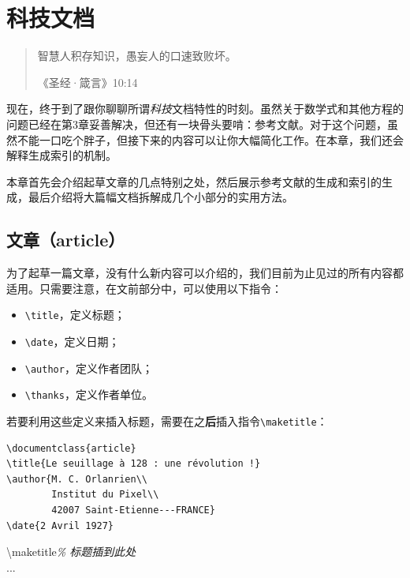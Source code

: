 \chapter{科技文档}

\begin{quote}
    智慧人积存知识，愚妄人的口速致败坏。
    
    \hfill《圣经·箴言》10:14
\end{quote}

现在，终于到了跟你聊聊所谓\emph{科技}文档特性的时刻。虽然关于数学式和其他方程的问题已经在第3章妥善解决，但还有一块骨头要啃：参考文献。对于这个问题，虽然不能一口吃个胖子，但接下来的内容可以让你大幅简化工作。在本章，我们还会解释生成索引的机制。

本章首先会介绍起草文章的几点特别之处，然后展示参考文献的生成和索引的生成，最后介绍将大篇幅文档拆解成几个小部分的实用方法。

\section{文章（article）}

为了起草一篇文章，没有什么新内容可以介绍的，我们目前为止见过的所有内容都适用。只需要注意，在文前部分中，可以使用以下指令：

\begin{itemize}
    \item \verb|\title|，定义标题；
    \item \verb|\date|，定义日期；
    \item \verb|\author|，定义作者团队；
    \item \verb|\thanks|，定义作者单位。
\end{itemize}

若要利用这些定义来插入标题，需要在\verb||之\textbf{后}插入指令\verb|\maketitle|：

\begin{dmd}
\begin{verbatim}
\documentclass{article}
\title{Le seuillage à 128 : une révolution !}
\author{M. C. Orlanrien\\
        Institut du Pixel\\
        42007 Saint-Etienne---FRANCE}
\date{2 Avril 1927}
\end{verbatim}
\backslash maketitle\textsl{\% 标题插到此处}\\
...\\
\verb||
\end{dmd}

